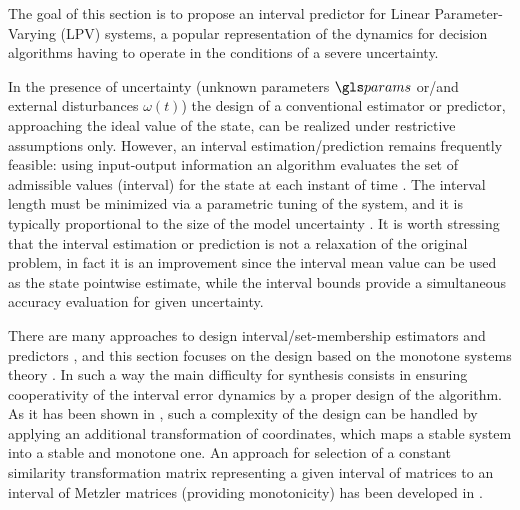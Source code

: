 
The goal of this section is to propose an interval predictor for Linear Parameter-Varying (LPV) systems, a popular representation of the dynamics \citep{Shamma2012,Marcos_Balas04,Shamma_Cloutier93,Tan97} for decision algorithms having to operate in the conditions of a severe uncertainty.

In the presence of uncertainty (unknown parameters $\params$ or/and external disturbances $\omega(t)$) the design of a conventional estimator or predictor, approaching the ideal value of the state, can be realized under restrictive assumptions only. However, an interval estimation/prediction remains frequently feasible: using input-output information an algorithm evaluates the set of admissible values (interval) for the state at each instant of time \citep{Efimov2016,Raiessi2018}. The interval length must be minimized via a parametric tuning of the system, and it is typically proportional to the size of the model uncertainty \citep{Chebotarev2015}. It is worth stressing that the interval estimation or prediction is not a relaxation of the original problem, in fact it is an improvement since the interval mean value can be used as the state pointwise estimate, while the interval bounds provide a simultaneous accuracy evaluation for given uncertainty.

There are many approaches to design interval/set-membership estimators and predictors \citep{Jaulin02,Kieffer_Walter04,Bernard_Gouze04,Moisan_Bernard_Gouze09}, and this section focuses on the design based on the monotone systems theory \citep{Bernard_Gouze04,Moisan_Bernard_Gouze09,RVZ10,REZ11,Efimov_a2012}.
In such a way the main difficulty for synthesis consists in ensuring cooperativity of the interval error dynamics by a proper design of the algorithm. As it has been shown in \citep{MazencBernard11,REZ11,Combastel2012}, such a complexity of the design can be handled by applying an additional transformation of coordinates, which maps a stable system into a stable and monotone one. An approach for selection of a constant similarity transformation matrix representing a given interval of matrices to an interval of Metzler matrices (providing monotonicity) has been developed in \citep{Efimov_a2013,Chebotarev2015}. 

